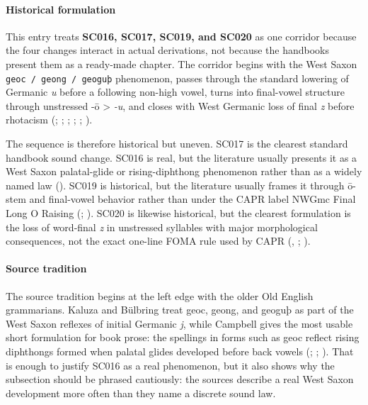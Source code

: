 \documentclass[
  british,
  a4paper,
]{article}
\begin{document}
\paragraph{Historical formulation}\label{historical-formulation-12}

This entry treats \textbf{SC016, SC017, SC019, and SC020} as one
corridor because the four changes interact in actual derivations, not
because the handbooks present them as a ready-made chapter. The corridor
begins with the West Saxon \texttt{geoc\ /\ geong\ /\ geoguþ}
phenomenon, passes through the standard lowering of Germanic \emph{u}
before a following non-high vowel, turns into final-vowel structure
through unstressed -ō \textgreater{} \emph{-u}, and closes with West
Germanic loss of final \emph{z} before rhotacism
(;
;
;
;
;
).

The sequence is therefore historical but uneven. SC017 is the clearest
standard handbook sound change. SC016 is real, but the literature
usually presents it as a West Saxon palatal-glide or rising-diphthong
phenomenon rather than as a widely named law
(). SC019 is
historical, but the literature usually frames it through ō-stem and
final-vowel behavior rather than under the CAPR label NWGmc Final Long O
Raising (;
). SC020 is likewise historical, but
the clearest formulation is the loss of word-final \emph{z} in
unstressed syllables with major morphological consequences, not the
exact one-line FOMA rule used by CAPR (, ; ).

\paragraph{Source tradition}\label{source-tradition-12}

The source tradition begins at the left edge with the older Old English
grammarians. Kaluza and Bülbring treat geoc, geong, and geoguþ as part
of the West Saxon reflexes of initial Germanic \emph{j}, while Campbell
gives the most usable short formulation for book prose: the spellings in
forms such as geoc reflect rising diphthongs formed when palatal glides
developed before back vowels (; ;
). That is enough to
justify SC016 as a real phenomenon, but it also shows why the subsection
should be phrased cautiously: the sources describe a real West Saxon
development more often than they name a discrete sound law.
\end{document}

